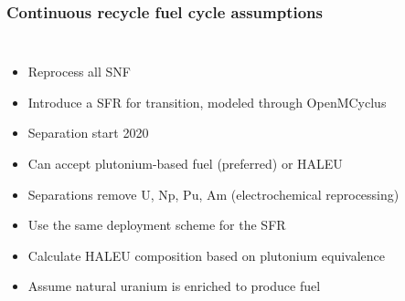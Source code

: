 \begin{frame}
    \frametitle{Continuous recycle fuel cycle assumptions}
    \begin{columns}
        
    \column[t]{6cm}
    

        \column[t]{4.5cm}
        \begin{itemize}
            \item Reprocess all \gls{SNF} 
            \item Introduce a \gls{SFR} for transition, modeled through 
                  OpenMCyclus
            \item Separation start 2020
            \item Can accept plutonium-based fuel (preferred) or \gls{HALEU}
            \item Separations remove U, Np, Pu, Am (electrochemical reprocessing)
            \item<2-> Use the same deployment scheme for the \gls{SFR}
            \item<2-> Calculate \gls{HALEU} composition based on plutonium
                      equivalence
            \item<3-> Assume natural uranium is enriched to produce 
                  fuel
        \end{itemize}

\end{columns}
\end{frame}

